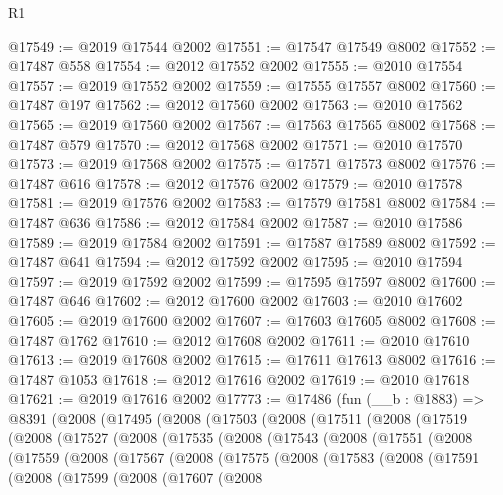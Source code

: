 \begin{lexlean}{R1}
\begin{coremodule}
@17549 := @2019 @17544 @2002
@17551 := @17547 @17549 @8002
@17552 := @17487 @558
@17554 := @2012 @17552 @2002
@17555 := @2010 @17554
@17557 := @2019 @17552 @2002
@17559 := @17555 @17557 @8002
@17560 := @17487 @197
@17562 := @2012 @17560 @2002
@17563 := @2010 @17562
@17565 := @2019 @17560 @2002
@17567 := @17563 @17565 @8002
@17568 := @17487 @579
@17570 := @2012 @17568 @2002
@17571 := @2010 @17570
@17573 := @2019 @17568 @2002
@17575 := @17571 @17573 @8002
@17576 := @17487 @616
@17578 := @2012 @17576 @2002
@17579 := @2010 @17578
@17581 := @2019 @17576 @2002
@17583 := @17579 @17581 @8002
@17584 := @17487 @636
@17586 := @2012 @17584 @2002
@17587 := @2010 @17586
@17589 := @2019 @17584 @2002
@17591 := @17587 @17589 @8002
@17592 := @17487 @641
@17594 := @2012 @17592 @2002
@17595 := @2010 @17594
@17597 := @2019 @17592 @2002
@17599 := @17595 @17597 @8002
@17600 := @17487 @646
@17602 := @2012 @17600 @2002
@17603 := @2010 @17602
@17605 := @2019 @17600 @2002
@17607 := @17603 @17605 @8002
@17608 := @17487 @1762
@17610 := @2012 @17608 @2002
@17611 := @2010 @17610
@17613 := @2019 @17608 @2002
@17615 := @17611 @17613 @8002
@17616 := @17487 @1053
@17618 := @2012 @17616 @2002
@17619 := @2010 @17618
@17621 := @2019 @17616 @2002
@17773 := @17486
    (fun (__b : @1883) =>
    @8391
      (@2008
        (@17495
          (@2008
            (@17503
              (@2008
                (@17511
                  (@2008
                    (@17519
                      (@2008
                        (@17527
                          (@2008
                            (@17535
                              (@2008
                                (@17543
                                  (@2008
                                    (@17551
                                      (@2008
                                        (@17559
                                          (@2008
                                            (@17567
                                              (@2008
                                                (@17575
                                                  (@2008
                                                    (@17583
                                                      (@2008
                                                        (@17591
                                                          (@2008
                                                            (@17599
                                                              (@2008
                                                                (@17607
                                                                  (@2008

\end{coremodule}
\end{lexlean}
